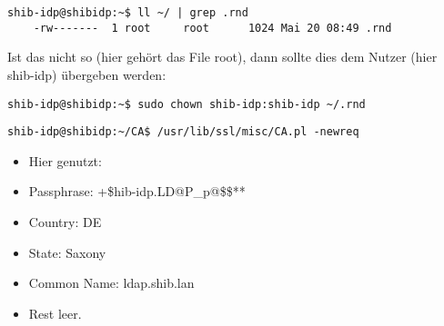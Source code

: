\begin{lstlisting}
shib-idp@shibidp:~$ ll ~/ | grep .rnd
	-rw-------  1 root     root      1024 Mai 20 08:49 .rnd
\end{lstlisting}
Ist das nicht so (hier gehört das File root), dann sollte dies dem Nutzer (hier
shib-idp) übergeben werden:
\begin{lstlisting}
shib-idp@shibidp:~$ sudo chown shib-idp:shib-idp ~/.rnd
\end{lstlisting}
\begin{lstlisting}
shib-idp@shibidp:~/CA$ /usr/lib/ssl/misc/CA.pl -newreq
\end{lstlisting}
\begin{itemize}
\item Hier genutzt:
\item Passphrase: +\$hib-idp.LD@P\_p@\$\$**
\item Country: DE
\item State: Saxony
\item Common Name: ldap.shib.lan
\item Rest leer.
\end{itemize}

